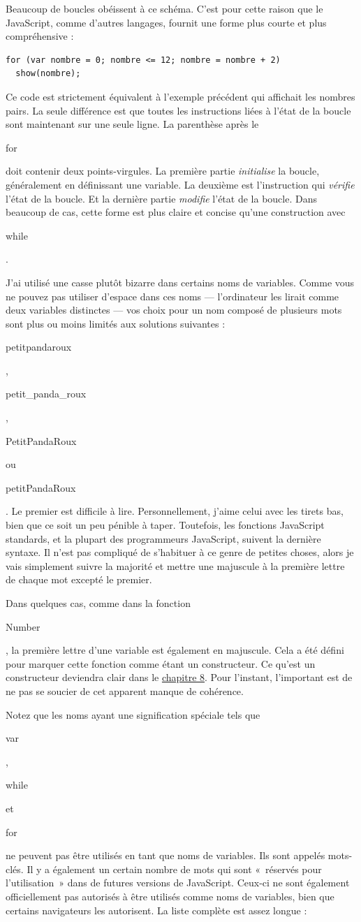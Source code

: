 \documentclass{FramateX}
\renewcommand{\texttt}[1]{\begin{sffamily}{#1}\end{sffamily}}
\begin{document}
Beaucoup de boucles obéissent à ce schéma. C'est pour cette raison que
le JavaScript, comme d'autres langages, fournit une forme plus courte et
plus compréhensive :

\begin{lstlisting}
for (var nombre = 0; nombre <= 12; nombre = nombre + 2)
  show(nombre);
\end{lstlisting}
Ce code est strictement équivalent à l'exemple précédent qui affichait
les nombres pairs. La seule différence est que toutes les instructions
liées à l'état de la boucle sont maintenant sur une seule ligne. La
parenthèse après le \texttt{for} doit contenir deux points-virgules. La
première partie \emph{initialise} la boucle, généralement en définissant
une variable. La deuxième est l'instruction qui \emph{vérifie} l'état de
la boucle. Et la dernière partie \emph{modifie} l'état de la boucle.
Dans beaucoup de cas, cette forme est plus claire et concise qu'une
construction avec \texttt{while}.

\begin{center}\end{center}

J'ai utilisé une casse plutôt bizarre dans certains noms de variables.
Comme vous ne pouvez pas utiliser d'espace dans ces noms ---
l'ordinateur les lirait comme deux variables distinctes --- vos choix
pour un nom composé de plusieurs mots sont plus ou moins limités aux
solutions suivantes : \texttt{petitpandaroux},
\texttt{petit\_panda\_roux}, \texttt{PetitPandaRoux} ou
\texttt{petitPandaRoux}. Le premier est difficile à lire.
Personnellement, j'aime celui avec les tirets bas, bien que ce soit un
peu pénible à taper. Toutefois, les fonctions JavaScript standards, et
la plupart des programmeurs JavaScript, suivent la dernière syntaxe. Il
n'est pas compliqué de s'habituer à ce genre de petites choses, alors je
vais simplement suivre la majorité et mettre une majuscule à la première
lettre de chaque mot excepté le premier.

Dans quelques cas, comme dans la fonction \texttt{Number}, la première
lettre d'une variable est également en majuscule. Cela a été défini pour
marquer cette fonction comme étant un constructeur. Ce qu'est un
constructeur deviendra clair dans le \href{chapter8.html}{chapitre 8}.
Pour l'instant, l'important est de ne pas se soucier de cet apparent
manque de cohérence.

Notez que les noms ayant une signification spéciale tels que
\texttt{var}, \texttt{while} et \texttt{for} ne peuvent pas être
utilisés en tant que noms de variables. Ils sont appelés mots-clés. Il y
a également un certain nombre de mots qui sont «~réservés pour
l'utilisation~» dans de futures versions de JavaScript. Ceux-ci ne sont
également officiellement pas autorisés à être utilisés comme noms de
variables, bien que certains navigateurs les autorisent. La liste
complète est assez longue :
\end{document}
